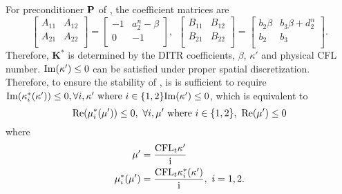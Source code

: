 For preconditioner $\mathbf{P}$ of ,
the coefficient matrices are
\begin{equation}
    \begin{bmatrix}
        A_{11} & A_{12} \\
        A_{21} & A_{22} \\
    \end{bmatrix} = \begin{bmatrix}
        -1 & a_2^n - \beta \\
        0  & -1            \\
    \end{bmatrix},\ \
    \begin{bmatrix}
        B_{11} & B_{12} \\
        B_{21} & B_{22} \\
    \end{bmatrix} = \begin{bmatrix}
        b_2\beta & b_3\beta + d_2^n \\
        b_2      & b_3              \\
    \end{bmatrix}.
    \label{eq:ABBetaForm}
\end{equation}
Therefore, $\mathbf{K}^*$ is determined by the DITR coefficients,
$\beta$, $\kappa'$ and physical CFL number.
$\mathrm{Im}(\kappa')\leq0$
can be satisfied under proper spatial discretization. 
Therefore, 
to ensure the stability of ,
is is sufficient to require 
$\mathrm{Im}(\kappa^*_i(\kappa'))\leq0, \forall i,\kappa'\text{ where } i \in \{1,2\} \mathrm{Im}(\kappa')\leq0$, 
which is equivalent to  
\begin{equation}
    \mathrm{Re}(\mu^*_i(\mu')) \leq 0,\ \forall i,\mu' \text{ where } i \in \{1,2\},\ \mathrm{Re}(\mu') \leq 0
\end{equation}
 where 
\begin{equation}
    \begin{aligned}
        \mu' &= \frac{\text{CFL}_t \kappa'}{\mathrm{i}}\\
        \mu^*_i(\mu') &= \frac{\text{CFL}_t\kappa^*_i(\kappa')}{\mathrm{i}},\ i=1,2.
    \end{aligned}
\end{equation}





